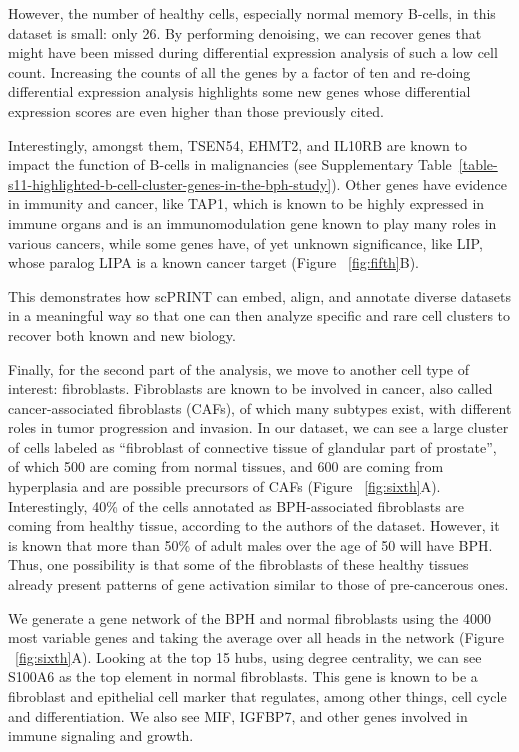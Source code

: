 However, the number of healthy cells, especially normal memory B-cells, in this dataset is small: only 26. By performing denoising, we can recover genes that might have been missed during differential expression analysis of such a low cell count. Increasing the counts of all the genes by a factor of ten and re-doing differential expression analysis highlights some new genes whose differential expression scores are even higher than those previously cited. 

Interestingly, amongst them, TSEN54, EHMT2, and IL10RB are known to impact the function of B-cells in malignancies (see Supplementary Table~\ref{table-s11-highlighted-b-cell-cluster-genes-in-the-bph-study}). Other genes have evidence in immunity and cancer, like TAP1, which is known to be highly expressed in immune organs and is an immunomodulation gene known to play many roles in various cancers\citep{zhuTAP1PotentialImmunerelated2023}, while some genes have, of yet unknown significance, like LIP, whose paralog LIPA is a known cancer target\citep{TargetingLIPAIndependent} (Figure ~\ref{fig:fifth}B). 

This demonstrates how \gls{scPRINT} can embed, align, and annotate diverse datasets in a meaningful way so that one can then analyze specific and rare cell clusters to recover both known and new biology.

Finally, for the second part of the analysis, we move to another cell type of interest: fibroblasts. Fibroblasts are known to be involved in cancer\citep{CancerassociatedFibroblastsBasic}, also called cancer-associated fibroblasts (\gls{CAF}s), of which many subtypes exist, with different roles in tumor progression and invasion\citep{FibroblastHeterogeneityProstate}. In our dataset, we can see a large cluster of cells labeled as “fibroblast of connective tissue of glandular part of prostate”, of which 500 are coming from normal tissues, and 600 are coming from hyperplasia and are possible precursors of \gls{CAF}s (Figure ~\ref{fig:sixth}A). Interestingly, 40\% of the cells annotated as \gls{BPH}-associated fibroblasts are coming from healthy tissue, according to the authors of the dataset. However, it is known that more than 50\% of adult males over the age of 50 will have \gls{BPH}\citep{EpidemiologyClinicalBenign}. Thus, one possibility is that some of the fibroblasts of these healthy tissues already present patterns of gene activation similar to those of pre-cancerous ones. 

We generate a gene network of the \gls{BPH} and normal fibroblasts using the 4000 most variable genes and taking the average over all heads in the network (Figure ~\ref{fig:sixth}A). Looking at the top 15 hubs, using degree centrality, we can see S100A6 as the top element in normal fibroblasts. This gene is known to be a fibroblast and epithelial cell marker that regulates, among other things, cell cycle and differentiation\citep{kuznickiCalcyclinMarkerHuman1992,S100A6MolecularFunction}. We also see MIF, IGFBP7, and other genes involved in immune signaling and growth\citep{WikiPathways2024Next,ROLEBIOMARKERMACROPHAGE,IGFBP7PromotesEndothelial}.

